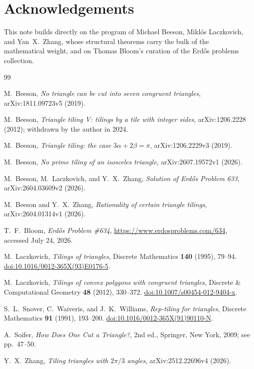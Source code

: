 \documentclass[11pt]{amsart}
\theoremstyle{remark}
\begin{document}
\section*{Acknowledgements}

This note builds directly on the program of Michael Beeson, Mikl\'os Laczkovich, and Yan~X.~Zhang, whose structural theorems carry the bulk of the mathematical weight, and on Thomas Bloom's curation of the Erd\H{o}s problems collection.

\begin{thebibliography}{99}

M.~Beeson,
\emph{No triangle can be cut into seven congruent triangles},
arXiv:1811.09723v5 (2019).

M.~Beeson,
\emph{Triangle tiling V: tilings by a tile with integer sides},
arXiv:1206.2228 (2012); withdrawn by the author in 2024.

M.~Beeson,
\emph{Triangle tiling: the case $3\alpha+2\beta=\pi$},
arXiv:1206.2229v3 (2019).

M.~Beeson,
\emph{No prime tiling of an isosceles triangle},
arXiv:2607.19572v1 (2026).

M.~Beeson, M.~Laczkovich, and Y.~X.~Zhang,
\emph{Solution of Erd\H{o}s Problem 633},
arXiv:2604.03609v2 (2026).

M.~Beeson and Y.~X.~Zhang,
\emph{Rationality of certain triangle tilings},
arXiv:2604.01314v1 (2026).

T.~F.~Bloom,
\emph{Erd\H{o}s Problem \#634},
\url{https://www.erdosproblems.com/634}, accessed July 24, 2026.

M.~Laczkovich,
\emph{Tilings of triangles},
Discrete Mathematics \textbf{140} (1995), 79--94.
\href{https://doi.org/10.1016/0012-365X(93)E0176-5}{doi:10.1016/0012-365X(93)E0176-5}.

M.~Laczkovich,
\emph{Tilings of convex polygons with congruent triangles},
Discrete \& Computational Geometry \textbf{48} (2012), 330--372.
\href{https://doi.org/10.1007/s00454-012-9404-x}{doi:10.1007/s00454-012-9404-x}.

S.~L.~Snover, C.~Waiveris, and J.~K.~Williams,
\emph{Rep-tiling for triangles},
Discrete Mathematics \textbf{91} (1991), 193--200.
\href{https://doi.org/10.1016/0012-365X(91)90110-N}{doi:10.1016/0012-365X(91)90110-N}.

A.~Soifer,
\emph{How Does One Cut a Triangle?},
2nd ed., Springer, New York, 2009; see pp.~47--50.

Y.~X.~Zhang,
\emph{Tiling triangles with $2\pi/3$ angles},
arXiv:2512.22696v4 (2026).

\end{thebibliography}
\end{document}

